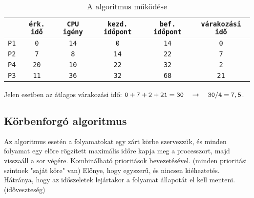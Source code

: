 \documentclass[../main.tex]{subfiles}
\begin{document}
\begin{table}[H]
  \centering
  \begin{tabular}{|c|c|c|c|c|c|}
    \hline
                & \texttt{érk. idő} & \texttt{CPU igény} & \texttt{kezd. időpont} & \texttt{bef. időpont} & \texttt{várakozási idő}
    \\ \hline
    \texttt{P1} & \texttt{0}        & \texttt{14}        & \texttt{0}             & \texttt{14}           & \texttt{0}              \\
    \texttt{P2} & \texttt{7}        & \texttt{8}         & \texttt{14}            & \texttt{22}           & \texttt{7}              \\
    \texttt{P4} & \texttt{20}       & \texttt{10}        & \texttt{22}            & \texttt{32}           & \texttt{2}              \\
    \texttt{P3} & \texttt{11}       & \texttt{36}        & \texttt{32}            & \texttt{68}           & \texttt{21}             \\
    \hline
  \end{tabular}
  \caption{A  algoritmus működése}
  \label{table:sjf}
\end{table}

Jelen esetben az átlagos várakozási idő:
$\mathtt{0 + 7 + 2 + 21 = 30}
  \hspace*{1em}\rightarrow\hspace*{1em}
  \mathtt{30/4 = 7,5}$.

\subsection{Körbenforgó algoritmus}

Az  algoritmus esetén a folyamatokat egy zárt körbe szervezzük, és
minden folyamat egy előre rögzített maximális időre kapja meg a processzort,
majd visszaáll a sor végére. Kombinálható prioritások bevezetésével.
(minden prioritási szintnek "saját köre" van) Előnye, hogy egyszerű, és
nincsen kiéheztetés. Hátránya, hogy az időszeletek lejártakor a folyamat
állapotát el kell menteni. (időveszteség)
\end{document}
